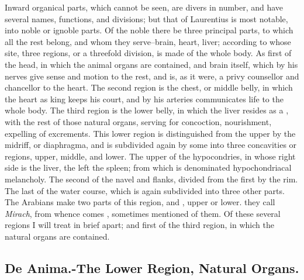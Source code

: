 Inward organical parts, which cannot be seen, are divers in number, and have
several names, functions, and divisions; but that of
Laurentius is most notable, into noble or ignoble parts. Of
the noble there be three principal parts, to which all the rest belong, and
whom they serve--brain, heart, liver; according to whose site, three regions,
or a threefold division, is made of the whole body. As first of the head, in
which the animal organs are contained, and brain itself, which by his nerves
give sense and motion to the rest, and is, as it were, a privy counsellor and
chancellor to the heart. The second region is the chest, or middle belly, in
which the heart as king keeps his court, and by his arteries communicates life
to the whole body. The third region is the lower belly, in which the liver
resides as a , with the rest of those natural organs,
serving for concoction, nourishment, expelling of excrements. This lower region
is distinguished from the upper by the midriff, or diaphragma, and is
subdivided again by some into three concavities or regions,
upper, middle, and lower. The upper of the hypocondries, in whose right side is
the liver, the left the spleen; from which is denominated hypochondriacal
melancholy. The second of the navel and flanks, divided from the first by the
rim. The last of the water course, which is again subdivided into three other
parts. The Arabians make two parts of this region,  and
, upper or lower.  they call \emph{Mirach},
from whence comes , sometimes mentioned of them. Of
these several regions I will treat in brief apart; and first of the third
region, in which the natural organs are contained.

\subsection[The Lower Region]{De Anima.-The Lower Region, Natural Organs.}

